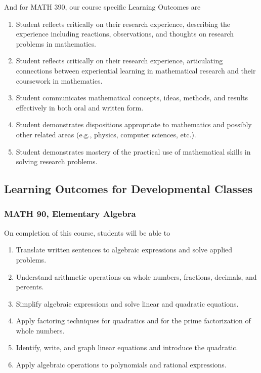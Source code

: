 \documentclass[11pt]{article}
\newenvironment{alphalist}{
\begin{enumerate}[label=(\arabic*),widest=107 ,leftmargin=25pt, itemsep=0pt]}
{\end{enumerate}}
\begin{document}
And for MATH 390, our course specific Learning Outcomes are
\begin{alphalist}
    \item  Student reflects critically on their research experience, describing the experience including reactions, observations, and thoughts on research problems in mathematics.
\item Student reflects critically on their research experience, articulating connections between experiential learning in mathematical research and their coursework in mathematics.
\item Student communicates mathematical concepts, ideas, methods, and results effectively in both oral and written form. 
\item Student demonstrates dispositions appropriate to mathematics and possibly other related areas (e.g., physics, computer sciences, etc.).
\item Student demonstrates mastery of the practical use of mathematical skills in solving research problems.
\end{alphalist}

\subsection{Learning Outcomes for Developmental Classes}

\subsubsection{MATH 90, Elementary Algebra}

On completion of this course, students will  be able to 
\begin{alphalist}
    \item Translate written sentences to algebraic expressions and solve applied problems.
    \item Understand arithmetic operations on whole numbers, fractions, decimals, and percents.
    \item Simplify algebraic expressions and solve linear and quadratic equations.
    \item Apply factoring techniques for quadratics and for the prime factorization of whole numbers.
    \item Identify, write, and graph linear equations and introduce the quadratic.
    \item Apply algebraic operations to polynomials and rational expressions.
\end{alphalist}
\end{document}
